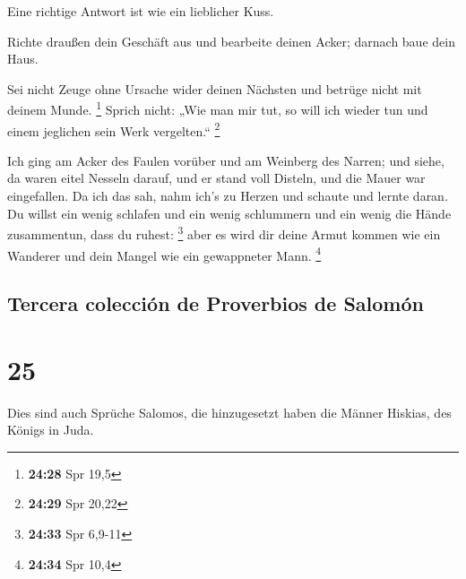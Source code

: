  Eine richtige Antwort ist wie ein lieblicher Kuss.

 Richte draußen dein Geschäft aus und bearbeite deinen
Acker; darnach baue dein Haus.

 Sei nicht Zeuge ohne Ursache wider deinen Nächsten und
betrüge nicht mit deinem Munde. \footnote{\textbf{24:28} Spr 19,5}
 Sprich nicht: „Wie man mir tut, so will ich wieder tun
und einem jeglichen sein Werk vergelten.`` \footnote{\textbf{24:29} Spr
  20,22}

 Ich ging am Acker des Faulen vorüber und am Weinberg des
Narren;  und siehe, da waren eitel Nesseln darauf, und er
stand voll Disteln, und die Mauer war eingefallen.  Da
ich das sah, nahm ich's zu Herzen und schaute und lernte daran.
 Du willst ein wenig schlafen und ein wenig schlummern
und ein wenig die Hände zusammentun, dass du ruhest: \footnote{\textbf{24:33}
  Spr 6,9-11}  aber es wird dir deine Armut kommen wie
ein Wanderer und dein Mangel wie ein gewappneter Mann. \footnote{\textbf{24:34}
  Spr 10,4}

\hypertarget{tercera-colecciuxf3n-de-proverbios-de-salomuxf3n}{%
\subsection{Tercera colección de Proverbios de
Salomón}\label{tercera-colecciuxf3n-de-proverbios-de-salomuxf3n}}

\hypertarget{section-24}{%
\section{25}\label{section-24}}

 Dies sind auch Sprüche Salomos, die hinzugesetzt haben
die Männer Hiskias, des Königs in Juda.

